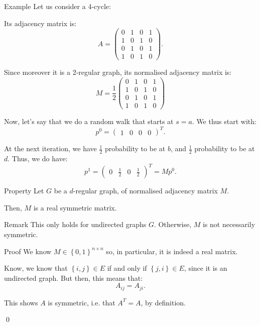 \documentclass[a4paper]{article}
\begin{document}
\begin{parag}{Example}
    Let us consider a 4-cycle:

    Its adjacency matrix is: 
    \[A = \begin{pmatrix} 0 & 1 & 0 & 1 \\ 1 & 0 & 1 & 0 \\ 0 & 1 & 0 & 1 \\ 1 & 0 & 1 & 0 \end{pmatrix} .\]
    
    Since moreover it is a 2-regular graph, its normalised adjacency matrix is: 
    \[M = \frac{1}{2}\begin{pmatrix} 0 & 1 & 0 & 1 \\ 1 & 0 & 1 & 0 \\ 0 & 1 & 0 & 1 \\ 1 & 0 & 1 & 0 \end{pmatrix} \]

    Now, let's say that we do a random walk that starts at $s = a$. We thus start with: 
    \[p^0 = \begin{pmatrix} 1 & 0 & 0 & 0 \end{pmatrix}^T.\]
    
    At the next iteration, we have $\frac{1}{2}$ probability to be at $b$, and $\frac{1}{2}$ probability to be at $d$. Thus, we do have: 
    \[p^1 = \begin{pmatrix} 0 & \frac{1}{2} & 0 & \frac{1}{2} \end{pmatrix}^T = M p^0.\]
\end{parag}

\begin{parag}{Property}
    Let $G$ be a $d$-regular graph, of normalised adjacency matrix $M$.

    Then, $M$ is a real symmetric matrix.

    \begin{subparag}{Remark}
        This only holds for undirected graphs $G$. Otherwise, $M$ is not necessarily symmetric.
    \end{subparag}

    \begin{subparag}{Proof}
        We know $M \in \left\{0, 1\right\}^{n \times n}$ so, in particular, it is indeed a real matrix.

        Know, we know that $\left\{i, j\right\}\in E$ if and only if $\left\{j, i\right\} \in E$, since it is an undirected graph. But then, this means that: 
        \[A_{ij} = A_{ji}.\]

        This shows $A$ is symmetric, i.e. that $A^T = A$, by definition.

        \qed
    \end{subparag}
\end{parag}
\end{document}
